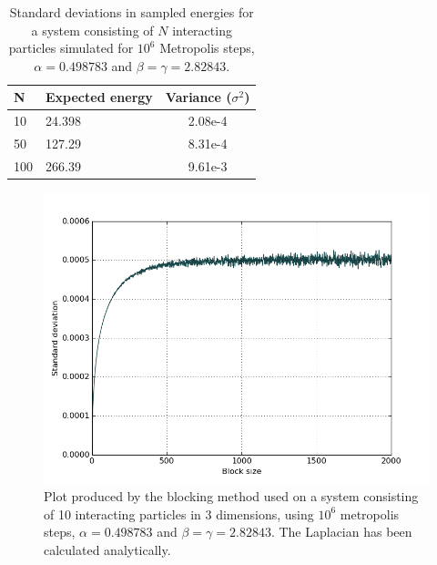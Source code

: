 \documentclass[english, a4paper]{article}
\begin{document}
\begin{table}[H]
	\centering
	\caption{Standard deviations in sampled energies for a system consisting of $N$ interacting particles simulated for $10^6$ Metropolis steps, $\alpha=0.498783$ and $\beta = \gamma = 2.82843$.}
	\begin{tabularx}{\textwidth}{ X X c }
		\toprule
		N & Expected energy & Variance ($\sigma^2$)\\*
		\hline
		10 & 24.398 & 2.08e-4\\%
		50 & 127.29 & 8.31e-4\\%
		100 & 266.39 & 9.61e-3\\%
 \bottomrule
\end{tabularx}
\label{tab:Tabell4}
\end{table}

\begin{figure}[H]
	\centering
	\includegraphics[width=0.7\linewidth]{../modifiedMortenCode/figures/N=10_D=3_alpha=0498783_steps=1e6_full.png}
	\caption{Plot produced by the blocking method used on a system consisting of 10 interacting particles in 3 dimensions, using $10^6$ metropolis steps, $\alpha=0.498783$ and $\beta = \gamma = 2.82843$. The Laplacian has been calculated analytically.}
	\label{fig:blocking_full}
\end{figure}


\end{document}
